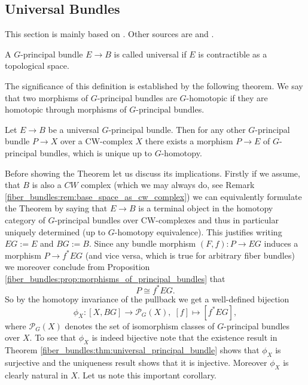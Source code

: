 \subsection{Universal Bundles}

This section is mainly based on \cite{ebert_bordism_script}. Other sources are \cite{mitchell_principalbundles} and \cite{dieck2008algebraic}.

\begin{definition}
    A $G$-principal bundle $E \to B$ is called universal if $E$ is contractible as a topological space.
\end{definition}

The significance of this definition is established by the following theorem. We say that two morphisms of $G$-principal bundles are $G$-homotopic if they are homotopic through morphisms of $G$-principal bundles.

\begin{theorem}
    \label{fiber_bundles:thm:universal_principal_bundle}
    Let $E \to B$ be a universal $G$-principal bundle. Then for any other $G$-principal bundle $P \to X$ over a CW-complex $X$ there exists a morphism $P \to E$ of $G$-principal bundles, which is unique up to $G$-homotopy.
\end{theorem}

Before showing the Theorem let us discuss its implications. Firstly if we assume, that $B$ is also a $CW$ complex (which we may always do, see Remark \ref{fiber_bundles:rem:base_space_as_cw_complex}) we can equivalently formulate the Theorem by saying that $E \to B$ is a terminal object in the homotopy category of $G$-principal bundles over CW-complexes and thus in particular uniquely determined (up to $G$-homotopy equivalence). This justifies writing $EG:= E$ and $BG := B$. Since any bundle morphism $(F,f) \colon P \to EG$ induces a morphism $P \to f^\ast EG$ (and vice versa, which is true for arbitrary fiber bundles) we moreover conclude from Proposition \ref{fiber_bundles:prop:morphisms_of_principal_bundles} that 
\[
P \cong f^\ast EG.
\]
So by the homotopy invariance of the pullback we get a well-defined bijection 
\[
\phi_X \colon [X,BG] \to \mathcal{P}_G(X), \; [f] \mapsto [f^\ast EG],
\]
where $\mathcal{P}_G(X)$ denotes the set of isomorphism classes of $G$-principal bundles over $X$. To see that $\phi_X$ is indeed bijective note that the existence result in Theorem \ref{fiber_bundles:thm:universal_principal_bundle} shows that $\phi_X$ is surjective and the uniqueness result shows that it is injective. Moreover $\phi_X$ is clearly natural in $X$. Let us note this important corollary.

